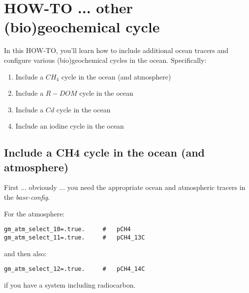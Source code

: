 \documentclass[11pt,fleqn]{book} %
\begin{document}

\newpage


\section{HOW-TO ...  other (bio)geochemical cycle}

In this HOW-TO, you'll learn how to include additional ocean tracers and configure various (bio)geochemical cycles in the ocean. Specifically:

\vspace{1mm}
\begin{enumerate}[noitemsep]
\vspace{1mm}
\item Include a \(CH_{4}\) cycle in the ocean (and atmosphere)
\vspace{1mm}
\item Include a \(R-DOM\) cycle in the ocean
\vspace{1mm}
\item Include a \(Cd\) cycle in the ocean
\vspace{1mm}
\item Include an iodine cycle in the ocean
\end{enumerate}

%
\newpage
%
\subsection*{Include a CH4 cycle in the ocean (and atmosphere)}
\vspace{1mm}

First ... obviously ... you need the appropriate ocean and atmospheric tracers in the \textit{base-config}.

\vspace{1mm}
\noindent For the atmosphere:
\small\vspace{-2pt}\begin{verbatim}
gm_atm_select_10=.true.     #   pCH4
gm_atm_select_11=.true.     #   pCH4_13C
\end{verbatim}\vspace{-2pt}\normalsize
and then also:
\small\vspace{-2pt}\begin{verbatim}
gm_atm_select_12=.true.     #   pCH4_14C
\end{verbatim}\vspace{-2pt}\normalsize
if you have a system including radiocarbon.
\end{document}
